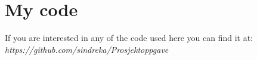 \chapter*{My code}%

If you are interested in any of the code used here you can find it at: \\
\emph{https://github.com/sindreka/Prosjektoppgave}

%
%
%		
%
%
